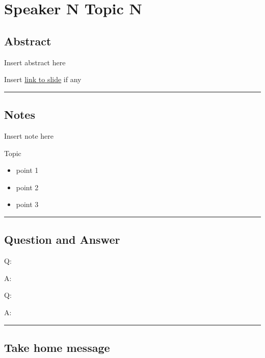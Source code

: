\documentclass[
]{book}
\providecommand{\tightlist}{%
  \setlength{\itemsep}{0pt}\setlength{\parskip}{0pt}}
\begin{document}
\hypertarget{speaker-n-topic-n-1}{%
\chapter{Speaker N Topic N}\label{speaker-n-topic-n-1}}

\hypertarget{abstract-1}{%
\section*{Abstract}\label{abstract-1}}

Insert abstract here

Insert \href{}{link to slide} if any

\begin{center}\rule{0.5\linewidth}{0.5pt}\end{center}

\hypertarget{notes-1}{%
\section*{Notes}\label{notes-1}}

Insert note here

Topic

\begin{itemize}
\tightlist
\item
  point 1
\item
  point 2
\item
  point 3
\end{itemize}

\begin{center}\rule{0.5\linewidth}{0.5pt}\end{center}

\hypertarget{question-and-answer-1}{%
\section*{Question and Answer}\label{question-and-answer-1}}

Q:

A:

Q:

A:

\begin{center}\rule{0.5\linewidth}{0.5pt}\end{center}

\hypertarget{take-home-message-1}{%
\section*{Take home message}\label{take-home-message-1}}
\end{document}
